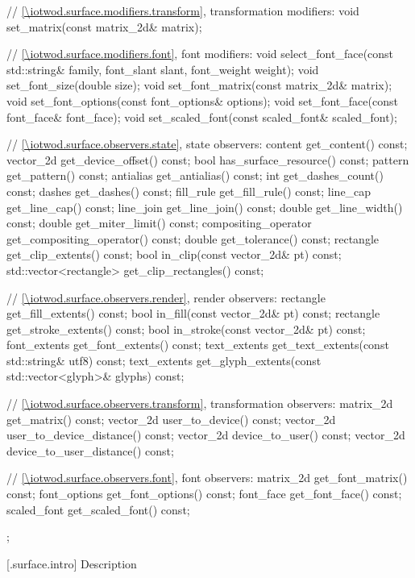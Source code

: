 \begin{codeblock}
{{{{{    // \ref{\iotwod.surface.modifiers.transform}, transformation modifiers:
    void set_matrix(const matrix_2d& matrix);

    // \ref{\iotwod.surface.modifiers.font}, font modifiers:
    void select_font_face(const std::string& family, font_slant slant, 
      font_weight weight);
    void set_font_size(double size);
    void set_font_matrix(const matrix_2d& matrix);
    void set_font_options(const font_options& options);
    void set_font_face(const font_face& font_face);
    void set_scaled_font(const scaled_font& scaled_font);

    // \ref{\iotwod.surface.observers.state}, state observers:
    content get_content() const;
    vector_2d get_device_offset() const;
    bool has_surface_resource() const;
    pattern get_pattern() const;
    antialias get_antialias() const;
    int get_dashes_count() const;
    dashes get_dashes() const;
    fill_rule get_fill_rule() const;
    line_cap get_line_cap() const;
    line_join get_line_join() const;
    double get_line_width() const;
    double get_miter_limit() const;
    compositing_operator get_compositing_operator() const;
    double get_tolerance() const;
    rectangle get_clip_extents() const;
    bool in_clip(const vector_2d& pt) const;
    std::vector<rectangle> get_clip_rectangles() const;

    // \ref{\iotwod.surface.observers.render}, render observers:
    rectangle get_fill_extents() const;
    bool in_fill(const vector_2d& pt) const;
    rectangle get_stroke_extents() const;
    bool in_stroke(const vector_2d& pt) const;
    font_extents get_font_extents() const;
    text_extents get_text_extents(const std::string& utf8) const;
    text_extents get_glyph_extents(const std::vector<glyph>& glyphs) const;

    // \ref{\iotwod.surface.observers.transform}, transformation observers:
    matrix_2d get_matrix() const;
    vector_2d user_to_device() const;
    vector_2d user_to_device_distance() const;
    vector_2d device_to_user() const;
    vector_2d device_to_user_distance() const;

    // \ref{\iotwod.surface.observers.font}, font observers:
    matrix_2d get_font_matrix() const;
    font_options get_font_options() const;
    font_face get_font_face() const;
    scaled_font get_scaled_font() const;
  };
} } } }
\end{codeblock}

 [\iotwod.surface.intro] { Description}


